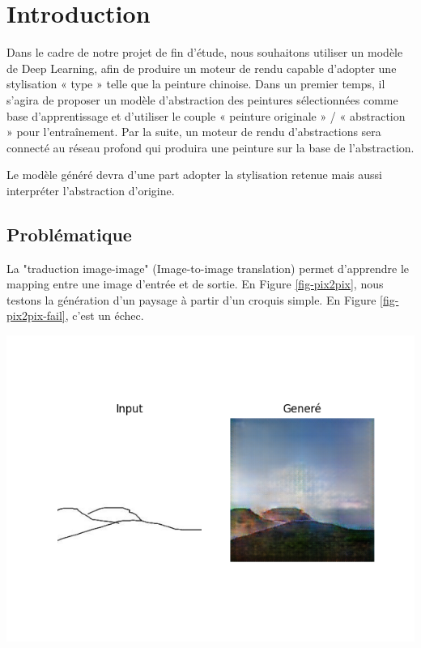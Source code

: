 \documentclass[a4paper, 12pt]{book}
\begin{document}
\mainmatter
\chapter*{Introduction}


Dans le cadre de notre projet de fin d'étude, nous souhaitons utiliser un modèle de Deep Learning, afin de produire un moteur de rendu capable d’adopter une stylisation « type » telle que la peinture chinoise. Dans un premier temps, il s’agira de proposer un modèle d’abstraction des peintures sélectionnées comme base d’apprentissage et d’utiliser le couple « peinture originale » / « abstraction » pour l’entraînement. Par la suite, un moteur de rendu d’abstractions sera connecté au réseau profond qui produira une peinture sur la base de l’abstraction.

Le modèle généré devra d'une part adopter la stylisation retenue mais aussi interpréter l'abstraction d'origine.

\section{Problématique}

La "traduction image-image" (Image-to-image translation) permet d'apprendre le mapping entre une image d'entrée et de sortie. En Figure \ref{fig-pix2pix}, nous testons la génération d'un paysage à partir d'un croquis simple. En Figure \ref{fig-pix2pix-fail}, c'est un échec.

\begin{center}
\includegraphics[width=0.7\linewidth]{images/pix2pix-t1.png}
\label{fig-pix2pix}
\end{center}
\end{document}
